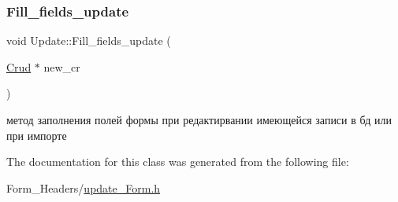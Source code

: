 \subsubsection{\texorpdfstring{Fill\_fields\_update}{Fill\_fields\_update}}
{\footnotesize\ttfamily void Update\+::\+Fill\+\_\+fields\+\_\+update (\begin{DoxyParamCaption}\item[{\mbox{\hyperlink{class_crud}{Crud}} $\ast$}]{new\+\_\+cr }\end{DoxyParamCaption})\hspace{0.3cm}{\ttfamily [slot]}}

метод заполнения полей формы при редактирвании имеющейся записи в бд или при импорте 

The documentation for this class was generated from the following file\+:\begin{DoxyCompactItemize}
\item 
Form\+\_\+\+Headers/\mbox{\hyperlink{update___form_8h}{update\+\_\+\+Form.\+h}}\end{DoxyCompactItemize}
